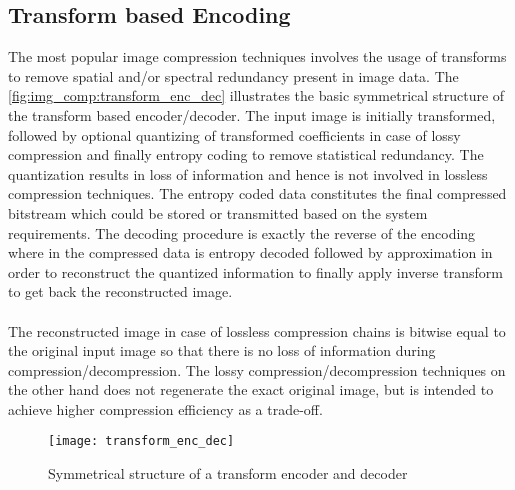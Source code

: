 \subsection{Transform based Encoding}
The most popular image compression techniques involves the usage of transforms to remove spatial and/or spectral redundancy present in image data. The \autoref{fig:img_comp:transform_enc_dec} illustrates the basic symmetrical structure of the transform based encoder/decoder. The input image is initially transformed, followed by optional quantizing of transformed coefficients in case of lossy compression and finally entropy coding to remove statistical redundancy. The quantization results in loss of information and hence is not involved in lossless compression techniques. The entropy coded data constitutes the final compressed bitstream which could be stored or transmitted based on the system requirements. The decoding procedure is exactly the reverse of the encoding where in the compressed data is entropy decoded followed by approximation in order to reconstruct the quantized information to finally apply inverse transform to get back the reconstructed image. \\\\
The reconstructed image in case of lossless compression chains is bitwise equal to the original input image so that there is no loss of information during compression/decompression. The lossy compression/decompression techniques on the other hand does not regenerate the exact original image, but is intended to achieve higher compression efficiency as a trade-off.
\begin{figure}[tb]
  \centering
  \texttt{[image: transform\_enc\_dec]}
  \caption{Symmetrical structure of a transform encoder and decoder}
  \label{fig:img_comp:transform_enc_dec}
\end{figure}
